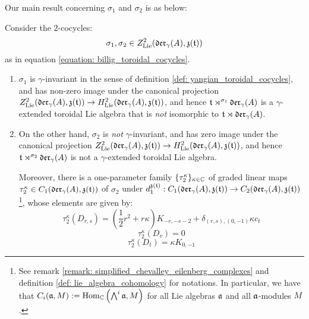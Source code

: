         Our main result concerning $\sigma_1$ and $\sigma_2$ is as below:
        \begin{theorem} \label{theorem: billig_cocycle_main_theorem}
            Consider the $2$-cocycles:
                $$\sigma_1, \sigma_2 \in Z^2_{\mathrm{Lie}}(\mathfrak{der}_{\gamma}(A), \mathfrak{z}(\mathfrak{t}))$$
            as in equation \eqref{equation: billig_toroidal_cocycles}.
            \begin{enumerate}
                \item $\sigma_1$ is $\gamma$-invariant in the sense of definition \ref{def: yangian_toroidal_cocycles}, and has non-zero image under the canonical projection $Z^2_{\mathrm{Lie}}(\mathfrak{der}_{\gamma}(A), \mathfrak{z}(\mathfrak{t})) \to H^2_{\mathrm{Lie}}(\mathfrak{der}_{\gamma}(A), \mathfrak{z}(\mathfrak{t}))$, and hence $\mathfrak{t} \rtimes^{\sigma_1} \mathfrak{der}_{\gamma}(A)$ is a $\gamma$-extended toroidal Lie algebra that is \textit{not} isomorphic to $\mathfrak{t} \rtimes \mathfrak{der}_{\gamma}(A)$.
                \item On the other hand, $\sigma_2$ is \textit{not} $\gamma$-invariant, and has zero image under the canonical projection $Z^2_{\mathrm{Lie}}(\mathfrak{der}_{\gamma}(A), \mathfrak{z}(\mathfrak{t})) \to H^2_{\mathrm{Lie}}(\mathfrak{der}_{\gamma}(A), \mathfrak{z}(\mathfrak{t}))$, and hence $\mathfrak{t} \rtimes^{\sigma_2} \mathfrak{der}_{\gamma}(A)$ is not a $\gamma$-extended toroidal Lie algebra.

                Moreover, there is a one-parameter family $\{\tau_2^{\kappa}\}_{\kappa \in \mathbb{C}}$ of graded linear maps $\tau_2^{\kappa} \in C_1(\mathfrak{der}_{\gamma}(A), \mathfrak{z}(\mathfrak{t}))$ of $\sigma_2$ under $d_1^{\mathfrak{z}(\mathfrak{t})}: C_1(\mathfrak{der}_{\gamma}(A), \mathfrak{z}(\mathfrak{t})) \to C_2(\mathfrak{der}_{\gamma}(A), \mathfrak{z}(\mathfrak{t}))$\footnote{See remark \ref{remark: simplified_chevalley_eilenberg_complexes} and definition \ref{def: lie_algebra_cohomology} for notations. In particular, we have that $C_i(\mathfrak{a}, M) := \mathrm{Hom}_{\mathbb{C}}\left(\bigwedge^i \mathfrak{a}, M \right)$ for all Lie algebras $\mathfrak{a}$ and all $\mathfrak{a}$-modules $M$.}, whose elements are given by:
                    $$\tau_2^{\kappa}(D_{r, s}) = \left( \frac12 r^2 + r\kappa \right) K_{-r, -s - 2} + \delta_{(r, s), (0, -1)} \kappa c_t$$
                    $$\tau_2^{\kappa}(D_v) = 0$$
                    $$\tau_2^{\kappa}(D_t) = \kappa K_{0, -1}$$
            \end{enumerate}
        \end{theorem}
